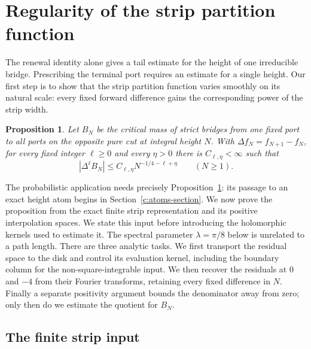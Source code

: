 \documentclass[11pt]{article}
\numberwithin{equation}{section}
\newtheorem{proposition}[theorem]{Proposition}
\theoremstyle{definition}\newtheorem{definition}[theorem]{Definition}
\theoremstyle{remark}\newtheorem{remark}[theorem]{Remark}
\begin{document}
\section{Regularity of the strip partition function}\label{c:smoothness-section}

The renewal identity alone gives a tail estimate for the height of one
irreducible bridge.  Prescribing the terminal port requires an estimate
for a single height.  Our first step is to show that the strip partition
function varies smoothly on its natural scale: every fixed forward
difference gains the corresponding power of the strip width.

\begin{proposition}\label{c:strip-smoothness}
Let $B_N$ be the critical mass of strict bridges from one fixed port to
all ports on the opposite pure cut at integral height $N$.  With
$\Delta f_N=f_{N+1}-f_N$, for every fixed integer $\ell\ge0$ and every
$\eta>0$ there is $C_{\ell,\eta}<\infty$ such that
\[
 |\Delta^\ell B_N|\le C_{\ell,\eta}N^{-1/4-\ell+\eta}
 \qquad(N\ge1).
\]
\end{proposition}

The probabilistic application needs precisely Proposition~\ref{c:strip-smoothness}:
its passage to an exact height atom begins in Section~\ref{c:atoms-section}.
We now prove the proposition from the exact finite strip representation and its positive
interpolation spaces.  We state this input before introducing the
holomorphic kernels used to estimate it.  The spectral parameter
$\lambda=\pi/8$ below is unrelated to a path length.
There are three analytic tasks.  We first transport the residual space
to the disk and control its evaluation kernel, including the boundary
column for the non-square-integrable input.  We then recover the residuals at $0$ and $-4$
from their Fourier transforms, retaining every fixed difference in $N$.
Finally a separate positivity argument bounds the denominator away from
zero; only then do we estimate the quotient for $B_N$.

\subsection{The finite strip input}
\end{document}
